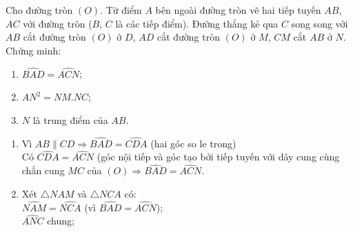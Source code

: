 \begin{ex}%
    Cho đường tròn $(O)$. Từ điểm $A$ bên ngoài đường tròn vẽ hai tiếp tuyến $AB$, $AC$ với đường tròn ($B$, $C$ là các tiếp điểm). Đường thẳng kẻ qua $C$ song song với $AB$ cắt đường tròn $(O)$ ở $D$, $AD$ cắt đường tròn $(O)$ ở $M$, $CM$ cắt $AB$ ở $N$. Chứng minh:
    \begin{enumerate}
        \item $\widehat{BAD}=\widehat{ACN}$;
        \item $AN^2=NM.NC$;
        \item $N$ là trung điểm của $AB$.
    \end{enumerate}
\loigiai
    {\begin{center}
    \end{center}
    \begin{enumerate}
        \item {Vì $AB \parallel CD \Rightarrow \widehat{BAD}=\widehat{CDA}$ (hai góc so le trong)\\
        Có $\widehat{CDA}=\widehat{ACN}$ (góc nội tiếp và góc tạo bởi tiếp tuyến với dây cung cùng chắn cung $MC$ của $(O)\Rightarrow \widehat{BAD}=\widehat{ACN}$.}
        \item {Xét $\triangle NAM$ và $\triangle NCA$ có:\\
        $\widehat{NAM}=\widehat{NCA}$ (vì $\widehat{BAD}=\widehat{ACN}$);\\
        $\widehat{ANC}$ chung;\\
}
\end{enumerate}}
\end{ex}
